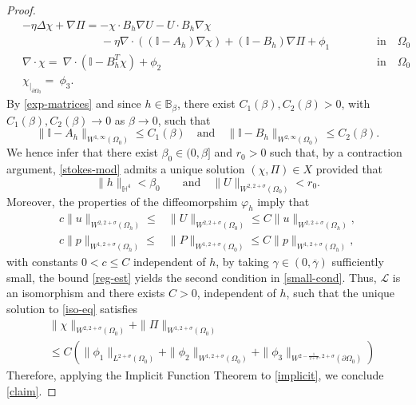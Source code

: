 \documentclass[10pt,a4paper]{amsart}
\begin{document}
\begin{proof}
\begin{equation}\label{stokes-mod}\begin{aligned}
&-\eta \Delta \chi + \nabla \Pi =  - \chi \cdot B_h\nabla U -U\cdot B_h\nabla \chi \\
&  \quad \qquad \qquad \qquad-\eta\nabla \cdot ((\mathbb{I}-A_h)\nabla \chi) + (\mathbb{I}-B_h)\nabla \Pi + \phi_1 \quad &&&&\mbox{in}  \quad \Omega_0 \\[5pt]\ &\nabla\cdot \chi  = \ \nabla \cdot (\mathbb{I}-B_h^T \chi) +\phi_2 \quad &&&&\mbox{in} \quad \Omega_0 \\[5pt]
&\chi_{|_{\partial \Omega_0}}= \ \phi_3.
\end{aligned}
\end{equation}
By \eqref{exp-matrices} and since $h\in \mathbb{B}_\beta$, there exist $C_1(\beta),C_2(\beta)>0$, with $C_{1}(\beta), C_2(\beta)\rightarrow 0$ as $\beta\rightarrow 0$, such that
$$\|\mathbb{I}-A_h\|_{W^{1, \infty}(\Omega_0)}\leq C_1(\beta) \quad \text{and} \quad \|\mathbb{I}-B_h\|_{W^{2,\infty}(\Omega_0)}\leq C_2(\beta).$$ We hence infer that
there exist $\beta_0\in (0, \beta]$ and $r_0>0$ such that, by a contraction argument,  \eqref{stokes-mod} admits a unique solution $(\chi, \Pi)\in X$ provided that
\begin{equation}\label{small-cond}
\|h\|_{\mathbb{H}^4}<\beta_0 \qquad \mbox{and} \quad 	\|U\|_{W^{2, 2+\sigma}(\Omega_0)}< r_0.
\end{equation} Moreover, the properties of the diffeomorpshim $\varphi_h$ imply that
\begin{equation}\label{controlU-u}\begin{aligned}
 c\|u\|_{W^{2, 2+\sigma}(\Omega_h)}\leq &\|U\|_{W^{2, 2+\sigma}(\Omega_0)}\leq C\|u\|_{W^{2, 2+\sigma}(\Omega_h)},\\[5pt] c\|p\|_{W^{1, 2+\sigma}(\Omega_h)}\leq &\|P\|_{W^{1, 2+\sigma}(\Omega_0)}\leq C\|p\|_{W^{1, 2+\sigma}(\Omega_h)},
 \end{aligned}
\end{equation} with constants $0<c\leq C$ independent of $h$, by taking $\gamma \in (0,\overline{\gamma})$ sufficiently small, the bound \eqref{reg-est}
yields the second condition in \eqref{small-cond}. Thus, $\mathcal{L}$ is an isomorphism and there exists $C>0$, independent of $h$, such that the unique solution to \eqref{iso-eq} satisfies
\begin{equation}\label{est-iso}\begin{aligned}
    &\|\chi\|_{W^{2, 2+\sigma}(\Omega_0)} + \|\Pi\|_{W^{1, 2+\sigma}(\Omega_0)} \\[5pt]&\leq C \left( \|\phi_1\|_{L^{2+\sigma}(\Omega_0)} + \|\phi_2\|_{W^{1, 2+\sigma}(\Omega_0)} + \|\phi_3\|_{W^{2-\frac{1}{2+\sigma}, 2+\sigma}(\partial \Omega_0)}\right)\end{aligned}
\end{equation}
Therefore,  applying the Implicit Function Theorem to \eqref{implicit}, we conclude \eqref{claim}.


\end{proof}
\end{document}
